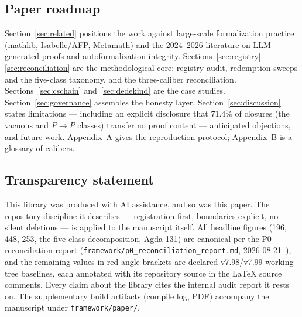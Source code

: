 \subsection{Paper roadmap}
\label{sec:roadmap}
Section~\ref{sec:related} positions the work against large-scale
formalization practice (mathlib, Isabelle/AFP, Metamath) and the
2024--2026 literature on LLM-generated proofs and autoformalization
integrity. Sections~\ref{sec:registry}--\ref{sec:reconciliation} are
the methodological core: registry audit, redemption sweeps and the
five-class taxonomy, and the three-caliber reconciliation.
Sections~\ref{sec:cschain} and~\ref{sec:dedekind} are the case
studies. Section~\ref{sec:governance} assembles the honesty layer.
Section~\ref{sec:discussion} states limitations --- including an
explicit disclosure that 71.4\% of closures (the vacuous and
$P\!\to\!P$ classes) transfer no proof content --- anticipated
objections, and future work. Appendix~A gives the reproduction
protocol; Appendix~B is a glossary of calibers.

\subsection{Transparency statement}
\label{sec:transparency}
This library was produced with AI assistance, and so was this paper.
The repository discipline it describes --- registration first,
boundaries explicit, no silent deletions --- is applied to the
manuscript itself. All headline figures (196, 448, 253, the
five-class decomposition, Agda 131) are canonical per the P0
reconciliation report
(\texttt{framework/p0\_reconciliation\_report.md}, 2026-08-21~\cite{sylvap0recon2026}), and
the remaining values in red angle brackets are declared
v7.98/v7.99 working-tree baselines, each annotated with its
repository source in the \LaTeX{} source comments. Every claim about
the library cites the internal audit report it rests on. The
supplementary build artifacts (compile log, PDF) accompany the
manuscript under \texttt{framework/paper/}.
